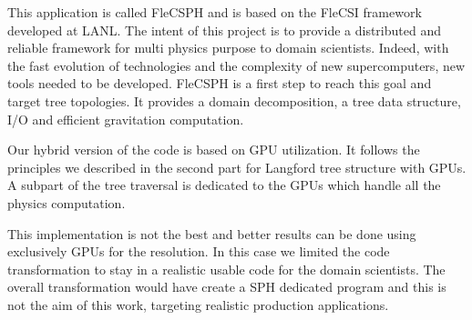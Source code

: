 This application is called FleCSPH and is based on the FleCSI framework developed at LANL. 
The intent of this project is to provide a distributed and reliable framework for multi physics purpose to domain scientists.
Indeed, with the fast evolution of technologies and the complexity of new supercomputers, new tools needed to be developed. 
FleCSPH is a first step to reach this goal and target tree topologies. 
It provides a domain decomposition, a tree data structure, I/O and efficient gravitation computation.

Our hybrid version of the code is based on GPU utilization. 
It follows the principles we described in the second part for Langford tree structure with GPUs. 
A subpart of the tree traversal is dedicated to the GPUs which handle all the physics computation.  

This implementation is not the best and better results can be done using exclusively GPUs for the resolution. 
In this case we limited the code transformation to stay in a realistic usable code for the domain scientists. 
The overall transformation would have create a SPH dedicated program and this is not the aim of this work, targeting realistic production applications. 